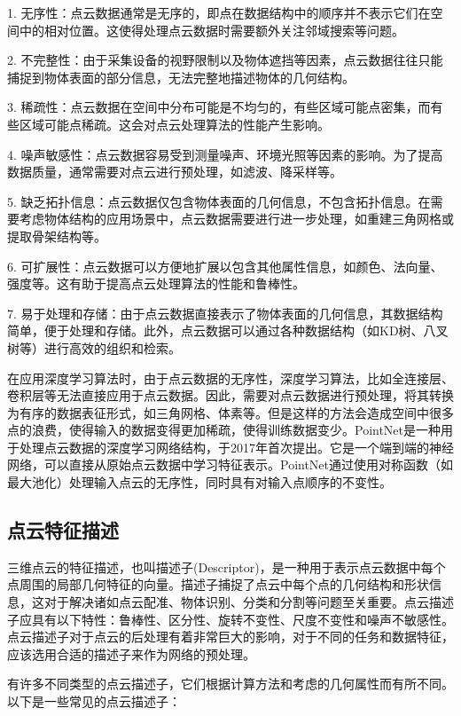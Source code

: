 1. 无序性：点云数据通常是无序的，即点在数据结构中的顺序并不表示它们在空间中的相对位置。这使得处理点云数据时需要额外关注邻域搜索等问题。

2. 不完整性：由于采集设备的视野限制以及物体遮挡等因素，点云数据往往只能捕捉到物体表面的部分信息，无法完整地描述物体的几何结构。

3. 稀疏性：点云数据在空间中分布可能是不均匀的，有些区域可能点密集，而有些区域可能点稀疏。这会对点云处理算法的性能产生影响。

4. 噪声敏感性：点云数据容易受到测量噪声、环境光照等因素的影响。为了提高数据质量，通常需要对点云进行预处理，如滤波、降采样等。

5. 缺乏拓扑信息：点云数据仅包含物体表面的几何信息，不包含拓扑信息。在需要考虑物体结构的应用场景中，点云数据需要进行进一步处理，如重建三角网格或提取骨架结构等。

6. 可扩展性：点云数据可以方便地扩展以包含其他属性信息，如颜色、法向量、强度等。这有助于提高点云处理算法的性能和鲁棒性。

7. 易于处理和存储：由于点云数据直接表示了物体表面的几何信息，其数据结构简单，便于处理和存储。此外，点云数据可以通过各种数据结构（如KD树、八叉树等）进行高效的组织和检索。

在应用深度学习算法时，由于点云数据的无序性，深度学习算法，比如全连接层、卷积层等无法直接应用于点云数据。因此，需要对点云数据进行预处理，将其转换为有序的数据表征形式，如三角网格\cite{jiang2020local}、体素\cite{guan2020voxel}等。但是这样的方法会造成空间中很多点的浪费，使得输入的数据变得更加稀疏，使得训练数据变少。PointNet\cite{qi2017pointnet}是一种用于处理点云数据的深度学习网络结构，于2017年首次提出。它是一个端到端的神经网络，可以直接从原始点云数据中学习特征表示。PointNet通过使用对称函数（如最大池化）处理输入点云的无序性，同时具有对输入点顺序的不变性。


\subsection{点云特征描述}
三维点云的特征描述，也叫描述子(Descriptor)，是一种用于表示点云数据中每个点周围的局部几何特征的向量。描述子捕捉了点云中每个点的几何结构和形状信息，这对于解决诸如点云配准、物体识别、分类和分割等问题至关重要。点云描述子应具有以下特性：鲁棒性、区分性、旋转不变性、尺度不变性和噪声不敏感性。点云描述子对于点云的后处理有着非常巨大的影响，对于不同的任务和数据特征，应该选用合适的描述子来作为网络的预处理。

有许多不同类型的点云描述子，它们根据计算方法和考虑的几何属性而有所不同。以下是一些常见的点云描述子：

